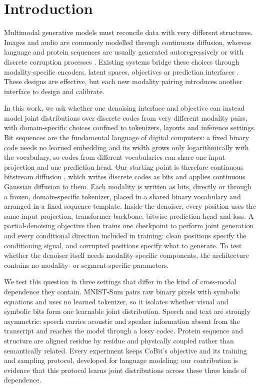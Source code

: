 \section{Introduction}
\label{sec:intro}

Multimodal generative models must reconcile data with very different structures. Images and audio
are commonly modelled through continuous diffusion, whereas language and protein sequences are
usually generated autoregressively or with discrete corruption processes
\citep{ho2020denoising,song2021score,austin2021structured,sahoo2024simple,wang2024dplm}. Existing
systems bridge these choices through modality-specific encoders, latent spaces, objectives or
prediction interfaces \citep{bao2023unidiffuser,tang2023codi,campbell2024multiflow,wang2025dplm2}.
These designs are effective, but each new modality pairing introduces another interface to design
and calibrate.

In this work, we ask whether one denoising interface and objective can instead model joint distributions over discrete codes from very different modality pairs, with domain-specific choices confined to tokenizers, layouts and inference settings. Bit sequences are the fundamental language of digital computers: a fixed binary code needs no learned embedding and its width grows only logarithmically with the vocabulary, so codes from different vocabularies can share one input projection and one prediction head. Our starting point is therefore continuous bitstream diffusion \citep{method:cobit}, which writes discrete codes as bits and applies continuous Gaussian diffusion to them. Each modality is written as bits, directly or through a frozen, domain-specific tokenizer, placed in a shared binary vocabulary and arranged in a fixed sequence template. Inside the denoiser, every position uses the same input
projection, transformer backbone, bitwise prediction head and loss. A partial-denoising objective
then trains one checkpoint to perform joint generation and every conditional direction included in
training: clean positions specify the conditioning signal, and corrupted positions specify what to
generate. To test whether the denoiser itself needs modality-specific components, the architecture contains no modality- or segment-specific parameters.

We test this question in three settings that differ in the kind of cross-modal dependence they contain. MNIST-Sum pairs raw binary pixels with symbolic equations and uses no learned tokenizer, so it isolates whether visual and symbolic bits form one learnable joint distribution. Speech and text are strongly asymmetric: speech carries acoustic and speaker information absent from the transcript and reaches the model through a lossy codec. Protein sequence and structure are aligned residue by residue and physically coupled rather than semantically related. Every experiment keeps CoBit's objective and its training and sampling protocol, developed for language modeling; our contribution is evidence that this protocol learns joint distributions across these three kinds of dependence.
